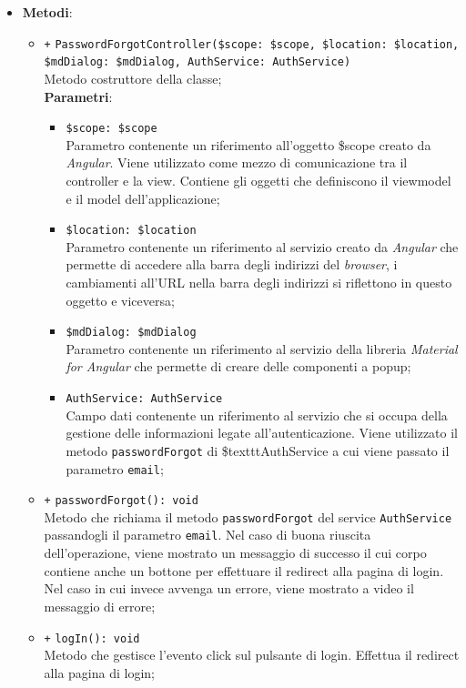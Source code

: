 \begin{itemize}
\begin{itemize}
	\end{itemize}
	\item \textbf{Metodi}:
	\begin{itemize}
		\item \texttt{+} \texttt{PasswordForgotController(\$scope: \$scope, \$location: \$location, \$mdDialog: \$mdDialog, AuthService: AuthService)} \\
		Metodo costruttore della classe; \\
		\textbf{Parametri}:
		\begin{itemize}
			\item \texttt{\$scope: \$scope} \\
			Parametro contenente un riferimento all’oggetto \$scope creato da \textit{Angular}. Viene utilizzato come mezzo di comunicazione tra il controller e la view. Contiene gli oggetti che definiscono il viewmodel e il model dell’applicazione;
			\item \texttt{\$location: \$location} \\
			Parametro contenente un riferimento al servizio creato da \textit{Angular} che permette di accedere alla barra degli indirizzi del \textit{browser}, i cambiamenti all’URL nella barra degli indirizzi si riflettono in questo oggetto e viceversa;
			\item \texttt{\$mdDialog: \$mdDialog} \\
			Parametro contenente un riferimento al servizio della libreria \textit{Material for Angular} che permette di creare delle componenti a popup;
			\item \texttt{AuthService: AuthService} \\
			Campo dati contenente un riferimento al servizio che si occupa della gestione delle informazioni legate all’autenticazione. Viene utilizzato il metodo \texttt{passwordForgot} di \$texttt{AuthService} a cui viene passato il parametro \texttt{email};
		\end{itemize}
		\item \texttt{+} \texttt{passwordForgot(): void} \\
		Metodo che richiama il metodo \texttt{passwordForgot} del service \texttt{AuthService} passandogli il parametro \texttt{email}. Nel caso di buona riuscita dell'operazione, viene mostrato un messaggio di successo il cui corpo contiene anche un bottone per effettuare il redirect alla pagina di login. Nel caso in cui invece avvenga un errore, viene mostrato a video il messaggio di errore;
		\item \texttt{+} \texttt{logIn(): void} \\
		Metodo che gestisce l’evento click sul pulsante di login. Effettua il redirect alla pagina di login;
	\end{itemize}
\end{itemize}

